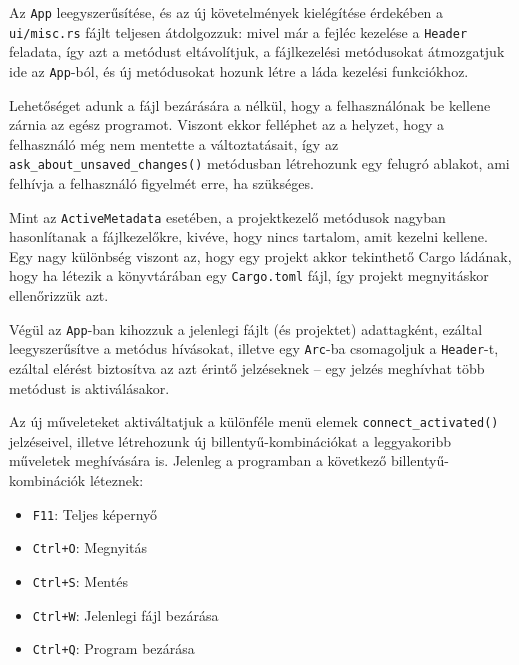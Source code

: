 
Az \texttt{App} leegyszerűsítése, és az új követelmények kielégítése érdekében a \texttt{ui/misc.rs}
fájlt teljesen átdolgozzuk: mivel már a fejléc kezelése a \texttt{Header} feladata,
így azt a metódust eltávolítjuk, a fájlkezelési metódusokat átmozgatjuk ide az \texttt{App}-ból,
és új metódusokat hozunk létre a láda kezelési funkciókhoz.



Lehetőséget adunk a fájl bezárására a nélkül, hogy a felhasználónak be kellene zárnia az egész programot.
Viszont ekkor felléphet az a helyzet, hogy a felhasználó még nem mentette a változtatásait,
így az \texttt{ask\_about\_unsaved\_changes()} metódusban létrehozunk egy felugró ablakot,
ami felhívja a felhasználó figyelmét erre, ha szükséges.

Mint az \texttt{ActiveMetadata} esetében, a projektkezelő metódusok nagyban hasonlítanak a fájlkezelőkre,
kivéve, hogy nincs tartalom, amit kezelni kellene.
Egy nagy különbség viszont az, hogy egy projekt akkor tekinthető Cargo ládának, hogy ha létezik a
könyvtárában egy \texttt{Cargo.toml} fájl, így projekt megnyitáskor ellenőrizzük azt.

Végül az \texttt{App}-ban kihozzuk a jelenlegi fájlt (és projektet) adattagként, 
ezáltal leegyszerűsítve a metódus hívásokat, illetve egy \texttt{Arc}-ba csomagoljuk
a \texttt{Header}-t, ezáltal elérést biztosítva az azt érintő jelzéseknek --
egy jelzés meghívhat több metódust is aktiválásakor.



Az új műveleteket aktiváltatjuk a különféle menü elemek \texttt{connect\_activated()} jelzéseivel,
illetve létrehozunk új billentyű-kombinációkat a leggyakoribb műveletek meghívására is.
Jelenleg a programban a következő billentyű-kombinációk léteznek:

\begin{itemize}
    \item \texttt{F11}: Teljes képernyő
    \item \texttt{Ctrl+O}: Megnyitás
    \item \texttt{Ctrl+S}: Mentés
    \item \texttt{Ctrl+W}: Jelenlegi fájl bezárása
    \item \texttt{Ctrl+Q}: Program bezárása
\end{itemize}

